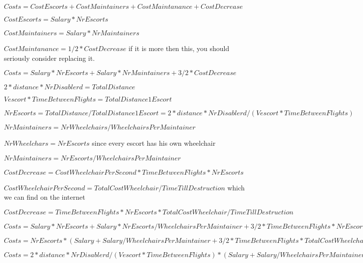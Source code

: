 \documentclass[a4paper, 12pt, notitlepage]{report}
\begin{document}
\begin{description}
	\item $Costs = CostEscorts + CostMaintainers + CostMaintanance + CostDecrease$
	\item $CostEscorts = Salary * NrEscorts$
	\item $CostMaintainers = Salary * NrMaintainers$
	\item $CostMaintanance = 1/2 * CostDecrease $ if it is more then this, you should seriously consider replacing it.
	\item 
	\item $Costs = Salary * NrEscorts + Salary * NrMaintainers + 3/2* CostDecrease$
	\item $2*distance*NrDisablerd= TotalDistance$
	\item $Vescort*TimeBetweenFlights = TotalDistance1Escort $
	\item $NrEscorts = TotalDistance/TotalDistance1Escort = 2*distance*NrDisablerd/(Vescort*TimeBetweenFlights)$
	\item 
	\item $NrMaintainers = NrWheelchairs/WheelchairsPerMaintainer$
	\item $NrWheelchars = NrEscorts$ since every escort has his own wheelchair
	\item $NrMaintainers = NrEscorts/WheelchairsPerMaintainer$
	\item 
	\item $CostDecrease  = CostWheelchairPerSecond * TimeBetweenFlights * NrEscorts$
	\item $CostWheelchairPerSecond = TotalCostWheelchair/TimeTillDestruction$ which we can find on the internet
	\item $CostDecrease  = TimeBetweenFlights * NrEscorts * TotalCostWheelchair/TimeTillDestruction$
	\item 
	\item $Costs = Salary * NrEscorts + Salary * NrEscorts/WheelchairsPerMaintainer + 3/2* TimeBetweenFlights * NrEscorts * TotalCostWheelchair/TimeTillDestruction$
	\item $Costs = NrEscorts * (Salary + Salary/WheelchairsPerMaintainer + 3/2* TimeBetweenFlights * TotalCostWheelchair/TimeTillDestruction)$
	\item $Costs = 2*distance*NrDisablerd/(Vescort*TimeBetweenFlights) * (Salary + Salary/WheelchairsPerMaintainer + 3/2* TimeBetweenFlights * TotalCostWheelchair/TimeTillDestruction)$
	\item 
\end{description}
\end{document}
